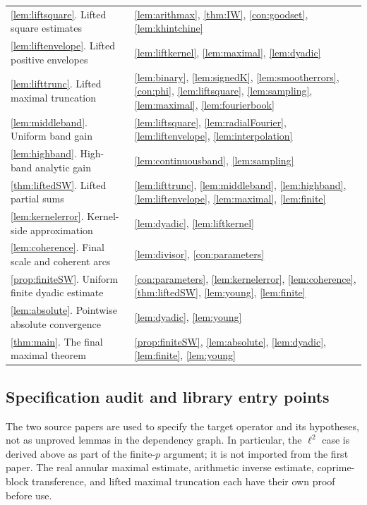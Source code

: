 \documentclass[11pt,oneside]{article}
\theoremstyle{definition}\newtheorem{definition}[theorem]{Definition}
\theoremstyle{remark}\newtheorem{remark}[theorem]{Remark}
\begin{document}
\begin{longtable}{@{}p{}p{}@{}}
\ref{lem:liftsquare}. Lifted square estimates & \ref{lem:arithmax}, \ref{thm:IW}, \ref{con:goodset}, \ref{lem:khintchine} \\
\ref{lem:liftenvelope}. Lifted positive envelopes & \ref{lem:liftkernel}, \ref{lem:maximal}, \ref{lem:dyadic} \\
\ref{lem:lifttrunc}. Lifted maximal truncation & \ref{lem:binary}, \ref{lem:signedK}, \ref{lem:smootherrors}, \ref{con:phi}, \ref{lem:liftsquare}, \ref{lem:sampling}, \ref{lem:maximal}, \ref{lem:fourierbook} \\
\ref{lem:middleband}. Uniform band gain & \ref{lem:liftsquare}, \ref{lem:radialFourier}, \ref{lem:liftenvelope}, \ref{lem:interpolation} \\
\ref{lem:highband}. High-band analytic gain & \ref{lem:continuousband}, \ref{lem:sampling} \\
\ref{thm:liftedSW}. Lifted partial sums & \ref{lem:lifttrunc}, \ref{lem:middleband}, \ref{lem:highband}, \ref{lem:liftenvelope}, \ref{lem:maximal}, \ref{lem:finite} \\
\ref{lem:kernelerror}. Kernel-side approximation & \ref{lem:dyadic}, \ref{lem:liftkernel} \\
\ref{lem:coherence}. Final scale and coherent arcs & \ref{lem:divisor}, \ref{con:parameters} \\
\ref{prop:finiteSW}. Uniform finite dyadic estimate & \ref{con:parameters}, \ref{lem:kernelerror}, \ref{lem:coherence}, \ref{thm:liftedSW}, \ref{lem:young}, \ref{lem:finite} \\
\ref{lem:absolute}. Pointwise absolute convergence & \ref{lem:dyadic}, \ref{lem:young} \\
\ref{thm:main}. The final maximal theorem & \ref{prop:finiteSW}, \ref{lem:absolute}, \ref{lem:dyadic}, \ref{lem:finite}, \ref{lem:young} \\
\end{longtable}
\endgroup

\subsection{Specification audit and library entry points}
The two source papers are used to specify the target operator and its
hypotheses, not as unproved lemmas in the dependency graph. In particular,
the $\ell^2$ case is derived above as part of the finite-$p$ argument; it is
not imported from the first paper. The real annular maximal estimate,
arithmetic inverse estimate, coprime-block transference, and lifted maximal
truncation each have their own proof before use.
\end{document}
